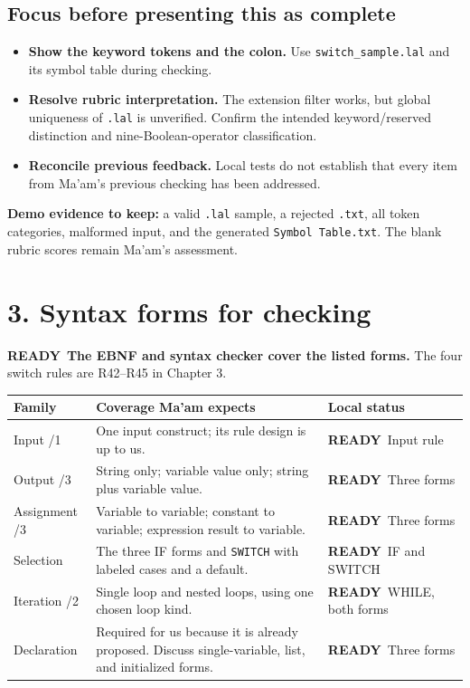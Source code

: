 \documentclass[11pt,a4paper]{article}
\newcommand{\code}[1]{\texttt{#1}}
\newcommand{\good}{\textcolor{ready}{\bfseries READY}}
\newcommand{\boxnote}[3]{\par\smallskip\begingroup\setlength{\fboxsep}{8pt}\colorbox{#1}{\parbox{\dimexpr\linewidth-2\fboxsep\relax}{\color{#2}\small #3}}\endgroup\par\smallskip}
\newcommand{\readybox}[1]{\boxnote{readybg}{ready}{#1}}
\newcommand{\neutralbox}[1]{\boxnote{cream}{black}{#1}}
\begin{document}
\subsection{Focus before presenting this as complete}
\begin{itemize}
\item \textbf{Show the keyword tokens and the colon.} Use \code{switch\_sample.lal} and its symbol table during checking.
\item \textcolor{focus}{\textbf{Resolve rubric interpretation.}} The extension filter works, but global
uniqueness of \code{.lal} is unverified. Confirm the intended keyword/reserved distinction
and nine-Boolean-operator classification.
\item \textcolor{focus}{\textbf{Reconcile previous feedback.}} Local tests do not establish that every item
from Ma'am's previous checking has been addressed.
\end{itemize}

\neutralbox{\textbf{Demo evidence to keep:} a valid \code{.lal} sample, a rejected \code{.txt},
all token categories, malformed input, and the generated \code{Symbol Table.txt}.
The blank rubric scores remain Ma'am's assessment.}

\clearpage
\section{3. Syntax forms for checking}
\readybox{\good\ \textbf{The EBNF and syntax checker cover the listed forms.}
The four switch rules are R42--R45 in Chapter 3.}

{\small\renewcommand{\arraystretch}{1.25}
\begin{tabularx}{\linewidth}{@{}L{29mm}Y L{35mm}@{}}
\toprule
\textbf{Family} & \textbf{Coverage Ma'am expects} & \textbf{Local status} \\\midrule
Input /1 & One input construct; its rule design is up to us. & \good\ Input rule \\
Output /3 & String only; variable value only; string plus variable value. & \good\ Three forms \\
Assignment /3 & Variable to variable; constant to variable; expression result to variable. & \good\ Three forms \\
Selection & The three IF forms and \code{SWITCH} with labeled cases and a default. & \good\ IF and SWITCH \\
Iteration /2 & Single loop and nested loops, using one chosen loop kind. & \good\ WHILE, both forms \\
Declaration & Required for us because it is already proposed. Discuss single-variable, list, and initialized forms. & \good\ Three forms \\\bottomrule
\end{tabularx}}
\end{document}
